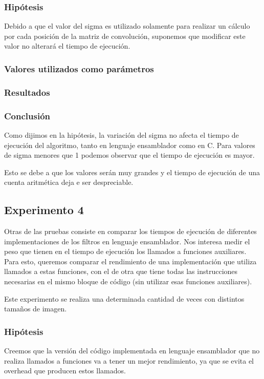 		\subsubsection{Hipótesis} 
			Debido a que el valor del sigma es utilizado solamente para realizar un cálculo por cada posición de la matriz de convolución, suponemos que modificar este valor no alterará el tiempo de ejecución.

		\subsubsection{Valores utilizados como parámetros} 

		\subsubsection{Resultados}

		\subsubsection{Conclusión}
			Como dijimos en la hipótesis, la variación del sigma no afecta el tiempo de ejecución del algoritmo, tanto en lenguaje ensamblador como en C. Para valores de sigma menores que 1 podemos observar que el tiempo de ejecución es mayor.

			Esto se debe a que los valores serán muy grandes y el tiempo de ejecución de una cuenta aritmética deja e ser despreciable. 

	\subsection{Experimento 4}
		Otras de las pruebas consiste en comparar los tiempos de ejecución de diferentes implementaciones de los filtros en lenguaje ensamblador. Nos interesa medir el peso que tienen en el tiempo de ejecución los llamados a funciones auxiliares. Para esto, queremos comparar el rendimiento de una implementación que utiliza llamados a estas funciones, con el de otra que tiene todas las instrucciones necesarias en el mismo bloque de código (sin utilizar esas funciones auxiliares). 
		
		Este experimento se realiza una determinada cantidad de veces con distintos tamaños de imagen.

		\subsubsection{Hipótesis} 
			Creemos que la versión del código implementada en lenguaje ensamblador que no realiza llamados a funciones va a tener un mejor rendimiento, ya que se evita el overhead que producen estos llamados.
		
